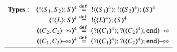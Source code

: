 \begin{figure}[t]
\small
\[
\begin{array}{rcl}
{\bf Types:} \quad 		\tmap{\btout{S_1, S_2}S}{4}
		&\!\!\!\!\defeq\!\!\!\!&
		\btout{\tmap{S_1}{4}}  \btout{\tmap{S_2}{4}}\tmap{S}{4}
		\\
		\tmap{\bbtout{L} S}{4}
		&\!\!\!\!\defeq\!\!\!\!&
		\bbtout{\mapt{L}^{4}}\mapt{S}^{4}
		\\
		\tmap{\shot{(C_2,  C_2)}}{4}
		&\!\!\!\!\defeq\!\!\!\!&
		\shot{\big(\btinp{\tmap{C_1}{4}}  \btinp{\tmap{C_2}{4}}\tinact\big)}
		\\
		\tmap{\lhot{(C_1,  C_2)}}{4}
		&\!\!\!\!\defeq\!\!\!\!&
		\lhot{\big(\btinp{\tmap{C_1}{4}}  \btinp{\tmap{C_2}{4}}\tinact\big)}
		\\[1mm]
\hline

\end{array}\]
\end{figure}
